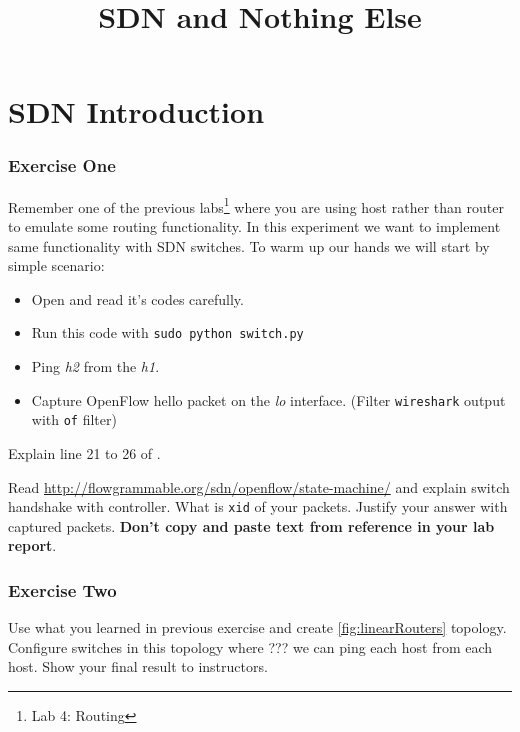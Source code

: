 \documentclass{../UTNetLab}
\title{SDN and Nothing Else}
\begin{document}
\part{SDN Introduction}
    \section{Exercise One}
    Remember one of the previous labs\footnote{Lab 4: Routing} where you are using host rather than router to emulate some routing functionality. In this experiment we want to implement same functionality with SDN switches. To warm up our hands we will start by simple scenario:

    \begin{itemize}
        \item Open  and read it's codes carefully.
        \item Run this code with \lstinline{sudo python switch.py}
        \item Ping \textit{h2} from the \textit{h1}.
        \item Capture OpenFlow hello packet on the \textit{lo} interface. (Filter \lstinline{wireshark} output with \lstinline{of} filter)
    \end{itemize}

    \begin{report}
        \item Explain line 21 to 26 of .
        \item Read \url{http://flowgrammable.org/sdn/openflow/state-machine/} and explain switch handshake with controller. What is \texttt{xid} of your packets. Justify your answer with captured packets. \textbf{Don't copy and paste text from reference in your lab report}.
    \end{report}

    \section{Exercise Two}
    Use what you learned in previous exercise and create \autoref{fig:linearRouters} topology. Configure switches in this topology where ??? we can ping each host from each host. Show your final result to instructors.
\end{document}
